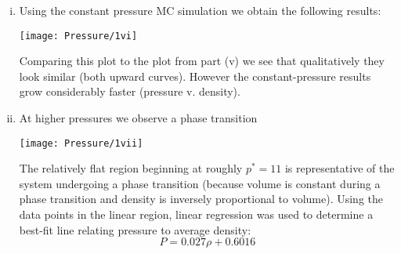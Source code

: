 \documentclass{article}
\begin{document}
\begin{enumerate}[i.]
  \item Using the constant pressure MC simulation we obtain the following results:
    \begin{center}
      \texttt{[image: Pressure/1vi]}
    \end{center}

    Comparing this plot to the plot from part (v) we see that qualitatively they look similar (both upward curves). However the constant-pressure results grow considerably faster (pressure v. density).

  \item At higher pressures we observe a phase transition
    \begin{center}
      \texttt{[image: Pressure/1vii]}
    \end{center}
    
    The relatively flat region beginning at roughly $p^*=11$ is representative of the system undergoing a phase transition (because volume is constant during a phase transition and density is inversely proportional to volume). Using the data points in the linear region, linear regression was used to determine a best-fit line relating pressure to average density:
    $$P = 0.027\rho + 0.6016$$

\end{enumerate}
\end{document}
